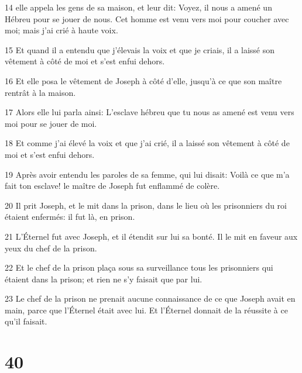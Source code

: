 \par 14 elle appela les gens de sa maison, et leur dit: Voyez, il nous a amené un Hébreu pour se jouer de nous. Cet homme est venu vers moi pour coucher avec moi; mais j'ai crié à haute voix.
\par 15 Et quand il a entendu que j'élevais la voix et que je criais, il a laissé son vêtement à côté de moi et s'est enfui dehors.
\par 16 Et elle posa le vêtement de Joseph à côté d'elle, jusqu'à ce que son maître rentrât à la maison.
\par 17 Alors elle lui parla ainsi: L'esclave hébreu que tu nous as amené est venu vers moi pour se jouer de moi.
\par 18 Et comme j'ai élevé la voix et que j'ai crié, il a laissé son vêtement à côté de moi et s'est enfui dehors.
\par 19 Après avoir entendu les paroles de sa femme, qui lui disait: Voilà ce que m'a fait ton esclave! le maître de Joseph fut enflammé de colère.
\par 20 Il prit Joseph, et le mit dans la prison, dans le lieu où les prisonniers du roi étaient enfermés: il fut là, en prison.
\par 21 L'Éternel fut avec Joseph, et il étendit sur lui sa bonté. Il le mit en faveur aux yeux du chef de la prison.
\par 22 Et le chef de la prison plaça sous sa surveillance tous les prisonniers qui étaient dans la prison; et rien ne s'y faisait que par lui.
\par 23 Le chef de la prison ne prenait aucune connaissance de ce que Joseph avait en main, parce que l'Éternel était avec lui. Et l'Éternel donnait de la réussite à ce qu'il faisait.

\chapter{40}

